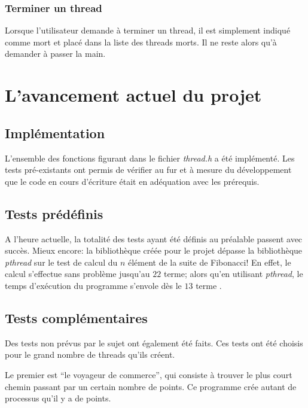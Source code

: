 \documentclass[a4paper,11pt]{article}
\begin{document}
\subsubsection*{Terminer un thread}

Lorsque l'utilisateur demande à terminer un thread, il est simplement indiqué comme mort et placé dans la liste des threads morts. Il ne reste alors qu'à demander à passer la main.


\section{L'avancement actuel du projet}

\subsection{Implémentation}

L'ensemble des fonctions figurant dans le fichier \textit{thread.h} a été implémenté. Les tests pré-existants ont permis de vérifier au fur et à mesure du développement que le code en cours d'écriture était en adéquation avec les prérequis.

\subsection{Tests prédéfinis}


A l'heure actuelle, la totalité des tests ayant été définis au préalable passent avec succès. Mieux encore: la bibliothèque créée pour le projet dépasse la bibliothèque \textit{pthread} sur le test de calcul du $n$ élément de la suite de Fibonacci! En effet, le calcul s'effectue sans problème jusqu'au $22$ terme; alors qu'en utilisant \textit{pthread}, le temps d'exécution du programme s'envole dès le $13$ terme .

\subsection{Tests complémentaires}
Des tests non prévus par le sujet ont également été faits. Ces tests ont été choisis pour le grand nombre de threads qu'ils créent.

Le premier est ``le voyageur de commerce'', qui consiste à trouver le plus court chemin passant par un certain nombre de points. Ce programme crée autant de processus qu'il y a de points. %
\end{document}
